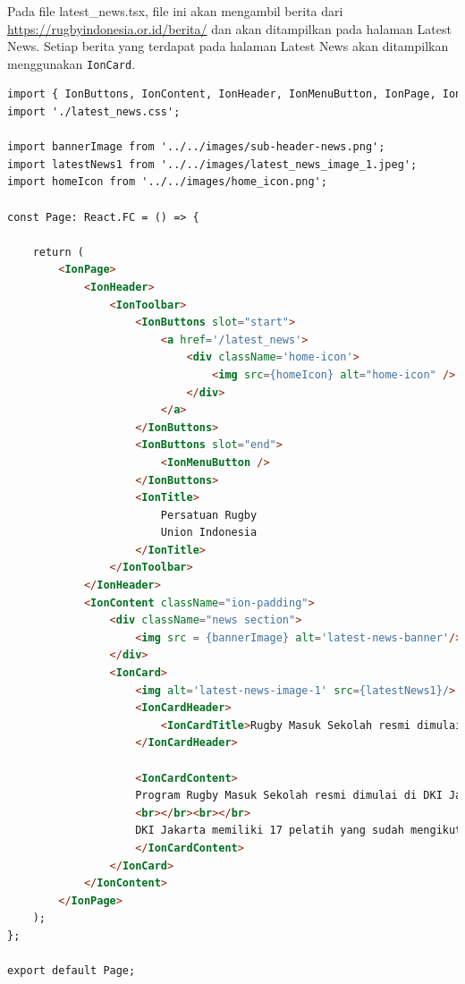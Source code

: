 Pada file latest\_news.tsx, file ini akan mengambil berita dari \url{https://rugbyindonesia.or.id/berita/} dan akan ditampilkan pada halaman Latest News. Setiap berita yang terdapat pada halaman Latest News akan ditampilkan menggunakan \texttt{IonCard}.

\begin{lstlisting}[language=HTML, caption=Kode dari latest\_news.tsx, label=kode:latest-news-tsx]
import { IonButtons, IonContent, IonHeader, IonMenuButton, IonPage, IonTitle, IonToolbar, IonBackButton, IonCard, IonCardHeader, IonCardTitle, IonCardContent} from '@ionic/react';
import './latest_news.css';

import bannerImage from '../../images/sub-header-news.png';
import latestNews1 from '../../images/latest_news_image_1.jpeg';
import homeIcon from '../../images/home_icon.png';

const Page: React.FC = () => {

    return (
        <IonPage>
            <IonHeader>
                <IonToolbar>
                    <IonButtons slot="start">
                        <a href='/latest_news'>
                            <div className='home-icon'>
                                <img src={homeIcon} alt="home-icon" />
                            </div>
                        </a> 
                    </IonButtons>
                    <IonButtons slot="end">
                        <IonMenuButton />
                    </IonButtons>
                    <IonTitle>
                        Persatuan Rugby
                        Union Indonesia
                    </IonTitle>
                </IonToolbar>
            </IonHeader>
            <IonContent className="ion-padding">
                <div className="news section">
                    <img src = {bannerImage} alt='latest-news-banner'/>
                </div>
                <IonCard>
                    <img alt='latest-news-image-1' src={latestNews1}/>
                    <IonCardHeader>
                        <IonCardTitle>Rugby Masuk Sekolah resmi dimulai di DKI Jakarta</IonCardTitle>
                    </IonCardHeader>

                    <IonCardContent>
                    Program Rugby Masuk Sekolah resmi dimulai di DKI Jakarta dengan serah terima Bola dan Baju Pelatih Rugby Masuk Sekolah dari PB PRUI ke PRUI DKI Jakarta pada Hari Sabtu, 25 November 2023 di Lapangan Pondok Bambu, Jakarta. Wakil Ketua II PB PRUI, Pak Agus Djamhoer menyerahkan paket Rugby Masuk Sekolah ini kepada Pak Tito Vau selaku Ketua PRUI DKI Jakarta pada acara Kejuaraan Daerah Rugby tingkat Pelajar DKI Jakarta. 
                    <br></br><br></br>
                    DKI Jakarta memiliki 17 pelatih yang sudah mengikuti sertifikasi pelatih Rugby Masuk Sekolah dan siap mengajarkan T1 Rugby ke seluruh tingkatan sekolah di Jakarta. Pada saat ini tercatat sudah lebih dari 13 sekolah di Jakarta dan jumlah sekolah ini akan terus ditingkatkan seiring dengan waktu program ini berjalan.
                    </IonCardContent>
                </IonCard>
            </IonContent>
        </IonPage>
    );
};

export default Page;
\end{lstlisting}

